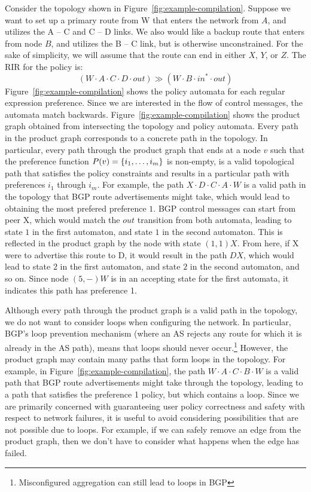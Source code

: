 Consider the topology shown in Figure~\ref{fig:example-compilation}. Suppose we want to set up a primary route from W that enters the network from $A$, and utilizes the A -- C and C -- D links. We also would like a backup route that enters from node $B$, and utilizes the B -- C link, but is otherwise unconstrained. For the sake of simplicity, we will assume that the route can end in either $X$, $Y$, or $Z$. The RIR for the policy is:
%
$$(W \cdot A \cdot C \cdot D \cdot out) \gg (W \cdot B \cdot in^* \cdot out)$$
%
Figure~\ref{fig:example-compilation} shows the policy automata for each regular expression preference. Since we are interested in the flow of control messages, the automata match backwards. 
%
Figure~\ref{fig:example-compilation} shows the product graph obtained from intersecting the topology and policy automata. Every path in the product graph corresponds to a concrete path in the topology. In particular, every path through the product graph that ends at a node $v$ such that the preference function $P(v) = \{ i_1, \dots, i_m \} $ is non-empty, is a valid topological path that satisfies the policy constraints and results in a particular path with preferences $i_1$ through $i_m$.
%
For example, the path $X \cdot D \cdot C \cdot A \cdot W$ is a valid path in the topology that BGP route advertisements might take, which would lead to obtaining the most prefered preference $1$.
BGP control messages can start from peer X, which would match the $out$ transition from both automata, leading to state $1$ in the first automaton, and state $1$ in the second automaton. This is reflected in the product graph by the node with state $(1,1) X$. From here, if X were to advertise this route to D, it would result in the path $D X$, which would lead to state $2$ in the first automaton, and state $2$ in the second automaton, and so on. Since node $(5,-) W$ is in an accepting state for the first automata, it indicates this path has preference 1.


Although every path through the product graph is a valid path in the topology, we do not want to consider loops when configuring the network. In particular, BGP's loop prevention mechanism (where an AS rejects any route for which it is already in the AS path), means that loops should never occur.\footnote{Misconfigured aggregation can still lead to loops in BGP}
%
However, the product graph may contain many paths that form loops in the topology. For example, in Figure~\ref{fig:example-compilation}, the path $W \cdot A \cdot C \cdot B \cdot W$ is a valid path that BGP route advertisements might take through the topology, leading to a path that satisfies the preference 1 policy, but which contains a loop.
%
Since we are primarily concerned with guaranteeing user policy correctness and safety with respect to network failures, it is useful to avoid considering possibilities that are not possible due to loops. For example, if we can safely remove an edge from the product graph, then we don't have to consider what happens when the edge has failed. 

